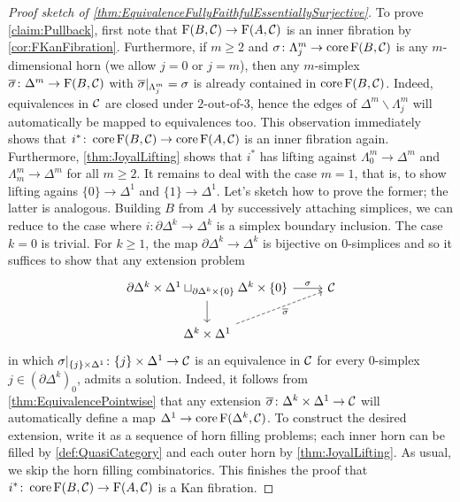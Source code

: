 \begin{proof}[Proof sketch of \cref{thm:EquivalenceFullyFaithfulEssentiallySurjective}]
	To prove \cref{claim:Pullback}, first note that $\operatorname{F}(B,\mathcal{C})\rightarrow \operatorname{F}(A,\mathcal{C})$ is an inner fibration by \cref{cor:FKanFibration}. Furthermore, if $m\geqslant 2$ and $\sigma\colon\Lambda_j^m\rightarrow \operatorname{core} \operatorname{F}(B,\mathcal{C})$ is any $m$-dimensional horn (we allow $j=0$ or $j=m$), then any $m$-simplex $\ov\sigma\colon \Delta^m\rightarrow \F(B,\Cc)$ with $\ov\sigma|_{\Lambda_j^m}=\sigma$ is already contained in $\operatorname{core} \operatorname{F}(B,\mathcal{C})$. Indeed, equivalences in $\mathcal{C}$ are closed under $2$-out-of-$3$, hence the edges of $\Delta^m\smallsetminus\Lambda_j^m$ will automatically be mapped to equivalences too. This observation immediately shows that $i^*\colon \operatorname{core}\operatorname{F}(B,\mathcal{C})\rightarrow \operatorname{core}\operatorname{F}(A,\mathcal{C})$ is an inner fibration again. Furthermore, \cref{thm:JoyalLifting} shows that $i^*$ has lifting against $\Lambda_0^m\rightarrow\Delta^m$ and $\Lambda_m^m\rightarrow \Delta^m$ for all $m\geqslant 2$. It remains to deal with the case $m=1$, that is, to show lifting agains $\{0\}\rightarrow\Delta^1$ and $\{1\}\rightarrow\Delta^1$. Let's sketch how to prove the former; the latter is analogous. Building $B$ from $A$ by successively attaching simplices, we can reduce to the case where $i\colon \partial \Delta^k\rightarrow\Delta^k$ is a simplex boundary inclusion. The case $k=0$ is trivial. For $k\geqslant 1$, the map $\partial\Delta^k\rightarrow\Delta^k$ is bijective on $0$-simplices and so it suffices to show that any extension problem
	\begin{equation*}
		\begin{tikzcd}
			\partial\Delta^k\times\Delta^1\sqcup_{\partial\Delta^k\times\{0\}}\Delta^k\times\{0\}\rar["\sigma"]\dar & \Cc\\
			\Delta^k\times\Delta^1\urar[dashed,"\ov\sigma"'] & 
		\end{tikzcd}
	\end{equation*}
	in which $\sigma|_{\{j\}\times\Delta^1}\colon \{j\}\times\Delta^1\rightarrow\mathcal{C}$ is an equivalence in $\mathcal{C}$ for every $0$-simplex $j\in(\partial\Delta^k)_0$, admits a solution. Indeed, it follows from \cref{thm:EquivalencePointwise} that any extension $\ov\sigma\colon \Delta^k\times\Delta^1\rightarrow\Cc$ will automatically define a map $\Delta^1\rightarrow\operatorname{core}\operatorname{F}(\Delta^k,\mathcal{C})$. To construct the desired extension, write it as a sequence of horn filling problems; each inner horn can be filled by \cref{def:QuasiCategory} and each outer horn by \cref{thm:JoyalLifting}. As usual, we skip the horn filling combinatorics. This finishes the proof that $i^*\colon \operatorname{core}\operatorname{F}(B,\mathcal{C})\rightarrow\operatorname{F}(A,\mathcal{C})$ is a Kan fibration.
	

\end{proof}
